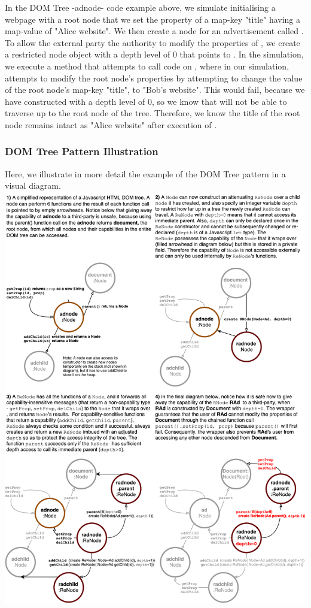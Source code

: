 \documentclass[a4paper,11pt,twoside]{article}
\begin{document}
In the DOM Tree -adnode- code example above, we simulate initialising a webpage with a root  node that we set the property of a map-key "title" having a map-value of "Alice website". We then create a node for an advertisement called . To allow the external party the authority to modify the properties of , we create a restricted node object  with a depth level of 0 that points to . In the simulation, we execute a method  that attempts to call code on , where in our simulation,  attempts to modify the root  node's properties by attempting to change the value of the root node's map-key "title", to "Bob's website". This would fail, because we have constructed  with a depth level of 0, so we know that  will not be able to traverse up to the root node of the tree. Therefore, we know the title of the root node remains intact as "Alice website" after execution of .
\begin{minipage}{\textwidth}
\subsubsection{DOM Tree Pattern Illustration}\label{sec:figdom}
Here, we illustrate in more detail the example of the DOM Tree pattern in a visual diagram.\\
\centering
\includegraphics[width=1.05\textwidth]{figures/DOM.pdf}
 \label{fig:figdom}
\end{minipage}
\clearpage
\end{document}
